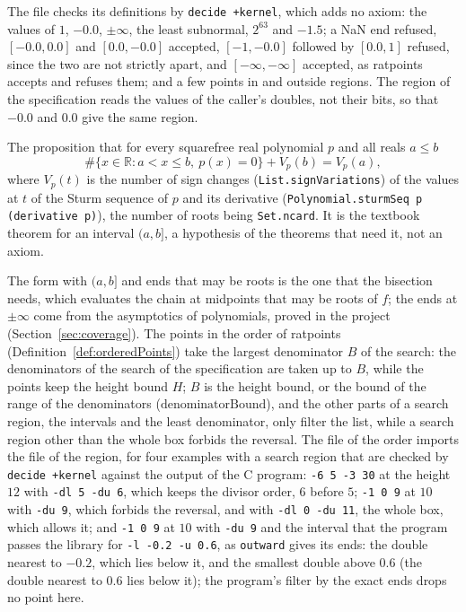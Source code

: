 The file checks its definitions by \verb|decide +kernel|, which adds no axiom: the values of $1$,
$-0.0$, $\pm\infty$, the least subnormal, $2^{63}$ and $-1.5$; a NaN end refused, $[-0.0, 0.0]$ and
$[0.0, -0.0]$ accepted, $[-1, -0.0]$ followed by $[0.0, 1]$ refused, since the two are not strictly
apart, and $[-\infty, -\infty]$ accepted, as ratpoints accepts and refuses them; and a few points in
and outside regions. The region of the specification reads the values of the caller's doubles, not
their bits, so that $-0.0$ and $0.0$ give the same region.

\begin{definition}\label{def:sturmTheorem}
  \leanok
  The proposition that for every squarefree real polynomial $p$ and all reals $a \le b$
  \[
    \#\{x \in \mathbb{R} : a < x \le b,\ p(x) = 0\} + V_p(b) = V_p(a),
  \]
  where $V_p(t)$ is the number of sign changes (\verb|List.signVariations|) of the values at $t$ of
  the Sturm sequence of $p$ and its derivative (\verb|Polynomial.sturmSeq p (derivative p)|), the
  number of roots being \verb|Set.ncard|. It is the textbook theorem for an interval $(a, b]$, a
  hypothesis of the theorems that need it, not an axiom.
\end{definition}

The form with $(a, b]$ and ends that may be roots is the one that the bisection needs, which
evaluates the chain at midpoints that may be roots of $f$; the ends at $\pm\infty$ come from the
asymptotics of polynomials, proved in the project (Section~\ref{sec:coverage}). The points in the
order of ratpoints (Definition~\ref{def:orderedPoints}) take the largest denominator $B$ of the
search: the denominators of the search of the specification are taken up to $B$, while the points
keep the height bound $H$; $B$ is the height bound, or the bound of the range of the denominators
($\mathrm{denominatorBound}$), and the other parts of a search region, the intervals and the least
denominator, only filter the list, while a search region other than the whole box forbids the
reversal. The file of the order imports the file of the region, for four examples with a search
region that are checked by \verb|decide +kernel| against the output of the C program:
\verb|-6 5 -3 30| at the height $12$ with \verb|-dl 5 -du 6|, which keeps the divisor order, $6$
before $5$; \verb|-1 0 9| at $10$ with \verb|-du 9|, which forbids the reversal, and with
\verb|-dl 0 -du 11|, the whole box, which allows it; and \verb|-1 0 9| at $10$ with \verb|-du 9| and
the interval that the program passes the library for \verb|-l -0.2 -u 0.6|, as \verb|outward| gives
its ends: the double nearest to $-0.2$, which lies below it, and the smallest double above $0.6$
(the double nearest to $0.6$ lies below it); the program's filter by the exact ends drops no point
here.

